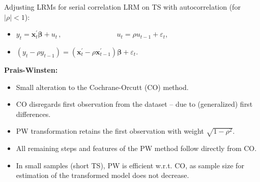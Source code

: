 \documentclass{beamer}
\begin{document}
\begin{frame}{Adjusting LRMs for serial correlation}
LRM on TS with autocorrelation (for $|\rho|<1$):\\ \medskip
\begin{itemize}
    \item $y_t=\bm{x}_t^{\prime} \bm{\beta} + u_t \,,\qquad \qquad \qquad~~~~~~~\, u_t = \rho u_{t-1}+\varepsilon_t$,
    \item $(y_t - \rho y_{t-1}) =  ( \bm{x}_t^{\prime} - \rho \bm{x}_{t-1}^{\prime}) \bm{\beta} + \varepsilon_t$.
\end{itemize}
\medskip
\textbf{Prais-Winsten:} \\ \medskip
\begin{itemize}
    \item Small alteration to the Cochrane-Orcutt (CO) method.
    \item CO disregards first observation from the dataset -- due to (generalized) first differences.
    \medskip
    \item PW transformation retains the first observation with weight $\sqrt{1-\rho^2}$.
    \item All remaining steps and features of the PW method follow directly from CO. 
    \item In small samples (short TS), PW is efficient w.r.t. CO, as sample size for estimation of the transformed model does not decrease.
\end{itemize}
\end{frame}
\end{document}
